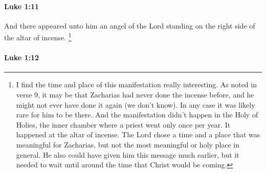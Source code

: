 		\paragraph{Luke 1:11} %
			\label{LUKE-1-11}

			And there appeared unto him an angel of the Lord standing on the right side of the altar of incense.%
			\footnote{%
				I find the time and place of this manifestation really interesting. As noted in verse 9, it may be that Zacharias had never done the incense before, and he might not ever have done it again (we don't know). In any case it was likely rare for him to be there. And the manifestation didn't happen in the Holy of Holies, the inner chamber where a priest went only once per year. It happened at the altar of incense. The Lord chose a time and a place that was meaningful for Zacharias, but not the most meaningful or holy place in general. He also could have given him this message much earlier, but it needed to wait until around the time that Christ would be coming.
				} 

			\begin{framed}
			\scriptsize
				\begin{compactdesc}
					\item[SBLG] 
				\end{compactdesc}
			\end{framed}

		\paragraph{Luke 1:12} %
			\label{LUKE-1-12}

